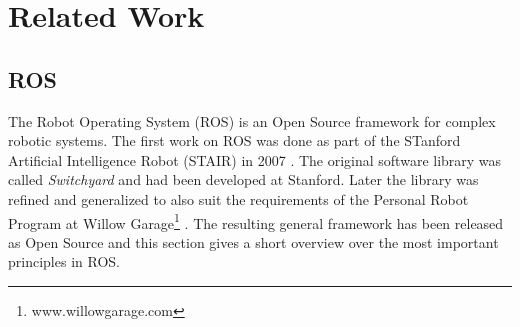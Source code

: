 \chapter{Related Work}

\section{ROS}
The Robot Operating System (ROS) is an Open Source framework for complex robotic systems. The first work on ROS was done as part of the STanford Artificial Intelligence Robot (STAIR) in 2007 \cite{Quigley2007}. The original software library was called \emph{Switchyard} and had been developed at Stanford. Later the library was refined and generalized to also suit the requirements of the Personal Robot Program at Willow Garage\footnote{www.willowgarage.com} \cite{Quigley2009}. The resulting general framework has been released as Open Source \cite{Quigley2009} and this section gives a short overview over the most important principles in ROS.

\begin{figure}[ht]
\centering
{}
\end{figure}

